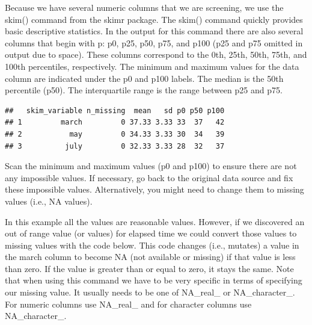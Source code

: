\documentclass[
]{krantz}
\makeatletter
\newenvironment{Shaded}{\begin{snugshade}}{\end{snugshade}}
\newcommand{\DataTypeTok}[1]{\textcolor[rgb]{0.27,0.27,0.27}{#1}}
\newcommand{\DecValTok}[1]{\textcolor[rgb]{0.06,0.06,0.06}{#1}}
\newcommand{\KeywordTok}[1]{\textcolor[rgb]{0.27,0.27,0.27}{\textbf{#1}}}
\newcommand{\NormalTok}[1]{#1}
\newcommand{\OperatorTok}[1]{\textcolor[rgb]{0.43,0.43,0.43}{\textbf{#1}}}
\newcommand{\OtherTok}[1]{\textcolor[rgb]{0.37,0.37,0.37}{#1}}
\newcommand{\StringTok}[1]{\textcolor[rgb]{0.5,0.5,0.5}{#1}}
\newenvironment{kframe}{%
\medskip{}
\setlength{\fboxsep}{.8em}
 \def\at@end@of@kframe{}%
 \ifinner\ifhmode%
  \def\at@end@of@kframe{\end{minipage}}%
  \begin{minipage}{\columnwidth}%
 \fi\fi%
 \def\FrameCommand##1{\hskip\@totalleftmargin \hskip-\fboxsep
 \colorbox{shadecolor}{##1}\hskip-\fboxsep
     \hskip-\linewidth \hskip-\@totalleftmargin \hskip\columnwidth}%
 \MakeFramed {\advance\hsize-\width
   \@totalleftmargin\z@ \linewidth\hsize
   \@setminipage}}%
 {\par\unskip\endMakeFramed%
 \at@end@of@kframe}
\renewenvironment{Shaded}{\begin{kframe}}{\end{kframe}}
\makeatother
\begin{document}
Because we have several numeric columns that we are screening, we use the skim() command from the skimr package. The skim() command quickly provides basic descriptive statistics. In the output for this command there are also several columns that begin with p: p0, p25, p50, p75, and p100 (p25 and p75 omitted in output due to space). These columns correspond to the 0th, 25th, 50th, 75th, and 100th percentiles, respectively. The minimum and maximum values for the data column are indicated under the p0 and p100 labels. The median is the 50th percentile (p50). The interquartile range is the range between p25 and p75.

\begin{Shaded}
\end{Shaded}

\begin{verbatim}
##   skim_variable n_missing  mean   sd p0 p50 p100
## 1         march         0 37.33 3.33 33  37   42
## 2           may         0 34.33 3.33 30  34   39
## 3          july         0 32.33 3.33 28  32   37
\end{verbatim}

Scan the minimum and maximum values (p0 and p100) to ensure there are not any impossible values. If necessary, go back to the original data source and fix these impossible values. Alternatively, you might need to change them to missing values (i.e., NA values).

In this example all the values are reasonable values. However, if we discovered an out of range value (or values) for elapsed time we could convert those values to missing values with the code below. This code changes (i.e., mutates) a value in the march column to become NA (not available or missing) if that value is less than zero. If the value is greater than or equal to zero, it stays the same. Note that when using this command we have to be very specific in terms of specifying our missing value. It usually needs to be one of NA\_real\_ or NA\_character\_. For numeric columns use NA\_real\_ and for character columns use NA\_character\_.

\begin{Shaded}
\end{Shaded}
\end{document}

